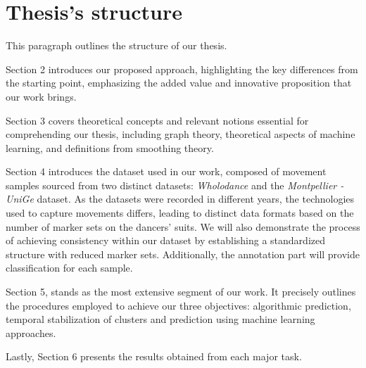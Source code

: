 \section{Thesis's structure}
This paragraph outlines the structure of our thesis. 

Section 2 introduces our proposed approach, highlighting the key differences from the starting point, emphasizing the added value and innovative proposition that our work brings. 

Section 3 covers theoretical concepts and relevant notions essential for comprehending our thesis, including graph theory, theoretical aspects of machine learning, and definitions from smoothing theory. 

Section 4 introduces the dataset used in our work, composed of movement samples sourced from two distinct datasets: \textit{Wholodance} and the \textit{Montpellier - UniGe} dataset.
As the datasets were recorded in different years, the technologies used to capture movements differs, leading to distinct data formats based on the number of marker sets on the dancers' suits.
We will also demonstrate the process of achieving consistency within our dataset by establishing a standardized structure with reduced marker sets.
Additionally, the annotation part will provide classification for each sample. 

Section 5, stands as the most extensive segment of our work.
It precisely outlines the procedures employed to achieve our three objectives: algorithmic prediction, temporal stabilization of clusters and prediction using machine learning approaches.

Lastly, Section 6 presents the results obtained from each major task.
